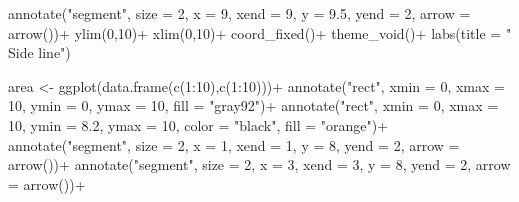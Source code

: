 \documentclass[
  letterpaper,
  DIV=11,
  numbers=noendperiod]{scrreprt}
\newenvironment{Shaded}{\begin{snugshade}}{\end{snugshade}}
\newcommand{\AttributeTok}[1]{\textcolor[rgb]{0.40,0.45,0.13}{#1}}
\newcommand{\DecValTok}[1]{\textcolor[rgb]{0.68,0.00,0.00}{#1}}
\newcommand{\FloatTok}[1]{\textcolor[rgb]{0.68,0.00,0.00}{#1}}
\newcommand{\FunctionTok}[1]{\textcolor[rgb]{0.28,0.35,0.67}{#1}}
\newcommand{\NormalTok}[1]{\textcolor[rgb]{0.00,0.23,0.31}{#1}}
\newcommand{\OtherTok}[1]{\textcolor[rgb]{0.00,0.23,0.31}{#1}}
\newcommand{\SpecialCharTok}[1]{\textcolor[rgb]{0.37,0.37,0.37}{#1}}
\newcommand{\StringTok}[1]{\textcolor[rgb]{0.13,0.47,0.30}{#1}}
\begin{document}
\begin{Shaded}
\begin{Highlighting}[]
  \FunctionTok{annotate}\NormalTok{(}\StringTok{"segment"}\NormalTok{, }\AttributeTok{size =} \DecValTok{2}\NormalTok{, }\AttributeTok{x =} \DecValTok{9}\NormalTok{, }\AttributeTok{xend =} \DecValTok{9}\NormalTok{, }\AttributeTok{y =} \FloatTok{9.5}\NormalTok{, }\AttributeTok{yend =} \DecValTok{2}\NormalTok{, }\AttributeTok{arrow =} \FunctionTok{arrow}\NormalTok{())}\SpecialCharTok{+}
  \FunctionTok{ylim}\NormalTok{(}\DecValTok{0}\NormalTok{,}\DecValTok{10}\NormalTok{)}\SpecialCharTok{+}
  \FunctionTok{xlim}\NormalTok{(}\DecValTok{0}\NormalTok{,}\DecValTok{10}\NormalTok{)}\SpecialCharTok{+}
  \FunctionTok{coord\_fixed}\NormalTok{()}\SpecialCharTok{+}
  \FunctionTok{theme\_void}\NormalTok{()}\SpecialCharTok{+}
  \FunctionTok{labs}\NormalTok{(}\AttributeTok{title =} \StringTok{"      Side line"}\NormalTok{)}

\NormalTok{area }\OtherTok{\textless{}{-}} \FunctionTok{ggplot}\NormalTok{(}\FunctionTok{data.frame}\NormalTok{(}\FunctionTok{c}\NormalTok{(}\DecValTok{1}\SpecialCharTok{:}\DecValTok{10}\NormalTok{),}\FunctionTok{c}\NormalTok{(}\DecValTok{1}\SpecialCharTok{:}\DecValTok{10}\NormalTok{)))}\SpecialCharTok{+}
  \FunctionTok{annotate}\NormalTok{(}\StringTok{"rect"}\NormalTok{, }\AttributeTok{xmin =} \DecValTok{0}\NormalTok{, }\AttributeTok{xmax =} \DecValTok{10}\NormalTok{, }\AttributeTok{ymin =} \DecValTok{0}\NormalTok{, }\AttributeTok{ymax =} \DecValTok{10}\NormalTok{, }\AttributeTok{fill =} \StringTok{"gray92"}\NormalTok{)}\SpecialCharTok{+}
  \FunctionTok{annotate}\NormalTok{(}\StringTok{"rect"}\NormalTok{, }\AttributeTok{xmin =} \DecValTok{0}\NormalTok{, }\AttributeTok{xmax =} \DecValTok{10}\NormalTok{, }\AttributeTok{ymin =} \FloatTok{8.2}\NormalTok{, }\AttributeTok{ymax =} \DecValTok{10}\NormalTok{, }\AttributeTok{color =} \StringTok{"black"}\NormalTok{, }\AttributeTok{fill =} \StringTok{"orange"}\NormalTok{)}\SpecialCharTok{+}
  \FunctionTok{annotate}\NormalTok{(}\StringTok{"segment"}\NormalTok{, }\AttributeTok{size =} \DecValTok{2}\NormalTok{, }\AttributeTok{x =} \DecValTok{1}\NormalTok{, }\AttributeTok{xend =} \DecValTok{1}\NormalTok{, }\AttributeTok{y =} \DecValTok{8}\NormalTok{, }\AttributeTok{yend =} \DecValTok{2}\NormalTok{, }\AttributeTok{arrow =} \FunctionTok{arrow}\NormalTok{())}\SpecialCharTok{+}
  \FunctionTok{annotate}\NormalTok{(}\StringTok{"segment"}\NormalTok{, }\AttributeTok{size =} \DecValTok{2}\NormalTok{, }\AttributeTok{x =} \DecValTok{3}\NormalTok{, }\AttributeTok{xend =} \DecValTok{3}\NormalTok{, }\AttributeTok{y =} \DecValTok{8}\NormalTok{, }\AttributeTok{yend =} \DecValTok{2}\NormalTok{, }\AttributeTok{arrow =} \FunctionTok{arrow}\NormalTok{())}\SpecialCharTok{+}

\end{Highlighting}
\end{Shaded}
\end{document}
